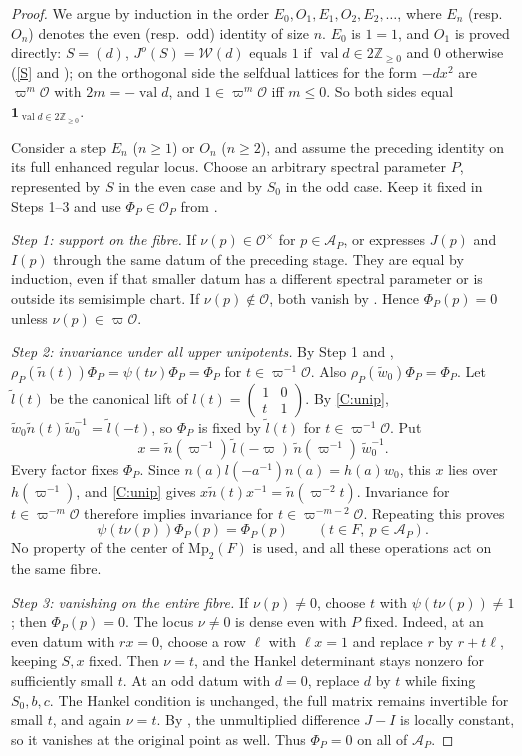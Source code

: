 \documentclass[11pt,oneside,notitlepage]{book}
\numberwithin{equation}{section}
\theoremstyle{plain}
\theoremstyle{definition}
\newcommand{\Z}{\mathbb{Z}}
\newcommand{\cO}{\mathcal{O}}
\newcommand{\Mp}{\mathrm{Mp}}
\newcommand{\cW}{\mathcal{W}}
\newcommand{\val}{\operatorname{val}}
\newcommand{\one}{\mathbf{1}}
\begin{document}
\begin{proof}
We argue by induction in the order $E_0,O_1,E_1,O_2,E_2,\dots$, where $E_n$ (resp.\ $O_n$) denotes the even (resp.\ odd) identity of size $n$. $E_0$ is $1=1$, and $O_1$ is proved directly: $S=(d)$, $J^o(S)=\cW(d)$ equals $1$ if $\val d\in2\Z_{\ge0}$ and $0$ otherwise (\ref{S} and ); on the orthogonal side the selfdual lattices for the form $-dx^2$ are $\varpi^m\cO$ with $2m=-\val d$, and $1\in\varpi^m\cO$ iff $m\le0$. So both sides equal $\one_{\val d\in2\Z_{\ge0}}$.

Consider a step $E_n$ ($n\ge1$) or $O_n$ ($n\ge2$), and assume the preceding identity on its full enhanced regular locus. Choose an arbitrary spectral parameter $P$, represented by $S$ in the even case and by $S_0$ in the odd case. Keep it fixed in Steps 1--3 and use $\Phi_P\in\mathcal O_P$ from .

\emph{Step 1: support on the fibre.} If $\nu(p)\in\cO^\times$ for $p\in\mathcal A_P$,  or  expresses $J(p)$ and $I(p)$ through the same datum of the preceding stage. They are equal by induction, even if that smaller datum has a different spectral parameter or is outside its semisimple chart. If $\nu(p)\notin\cO$, both vanish by . Hence $\Phi_P(p)=0$ unless $\nu(p)\in\varpi\cO$.

\emph{Step 2: invariance under all upper unipotents.} By Step 1 and , $\rho_P(\tilde n(t))\Phi_P=\psi(t\nu)\Phi_P=\Phi_P$ for $t\in\varpi^{-1}\cO$. Also $\rho_P(\tilde w_0)\Phi_P=\Phi_P$. Let $\tilde l(t)$ be the canonical lift of $l(t)=\left(\begin{smallmatrix}1&0\\t&1\end{smallmatrix}\right)$. By \ref{C:unip}, $\tilde w_0\tilde n(t)\tilde w_0^{-1}=\tilde l(-t)$, so $\Phi_P$ is fixed by $\tilde l(t)$ for $t\in\varpi^{-1}\cO$. Put
\[
 x=\tilde n(\varpi^{-1})\,\tilde l(-\varpi)\,
       \tilde n(\varpi^{-1})\,\tilde w_0^{-1}.
\]
Every factor fixes $\Phi_P$. Since $n(a)l(-a^{-1})n(a)=h(a)w_0$, this $x$ lies over $h(\varpi^{-1})$, and \ref{C:unip} gives $x\tilde n(t)x^{-1}=\tilde n(\varpi^{-2}t)$. Invariance for $t\in\varpi^{-m}\cO$ therefore implies invariance for $t\in\varpi^{-m-2}\cO$. Repeating this proves
\[
 \psi(t\nu(p))\Phi_P(p)=\Phi_P(p)
 \qquad(t\in F,\ p\in\mathcal A_P).
\]
No property of the center of $\Mp_2(F)$ is used, and all these operations act on the same fibre.

\emph{Step 3: vanishing on the entire fibre.} If $\nu(p)\ne0$, choose $t$ with $\psi(t\nu(p))\ne1$; then $\Phi_P(p)=0$. The locus $\nu\ne0$ is dense even with $P$ fixed. Indeed, at an even datum with $rx=0$, choose a row $\ell$ with $\ell x=1$ and replace $r$ by $r+t\ell$, keeping $S,x$ fixed. Then $\nu=t$, and the Hankel determinant stays nonzero for sufficiently small $t$. At an odd datum with $d=0$, replace $d$ by $t$ while fixing $S_0,b,c$. The Hankel condition is unchanged, the full matrix remains invertible for small $t$, and again $\nu=t$. By , the unmultiplied difference $J-I$ is locally constant, so it vanishes at the original point as well. Thus $\Phi_P=0$ on all of $\mathcal A_P$.


\end{proof}
\end{document}
